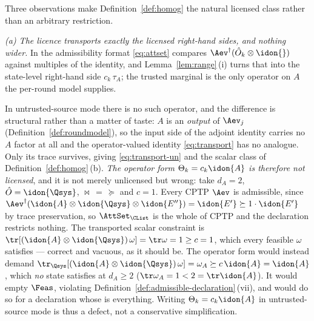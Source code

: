 
\begin{remark}\label{rem:homog}
Three observations make Definition~\ref{def:homog} the natural
licensed class rather than an arbitrary restriction.

\emph{(a) The licence transports exactly the licensed right-hand sides, and
nothing wider.} In  the admissibility format
\eqref{eq:attset} compares $\Aev^{\dagger}(\hat O_k\otimes\idon{})$ against
multiples of the identity, and Lemma~\ref{lem:range}\,(i) turns that into the
state-level right-hand side $c_k\,\tau_A$; the trusted marginal is the only
operator on $A$ the per-round model supplies.

In untrusted-source mode there is no such operator, and the difference
is structural rather than a matter of taste: $A$ is an \emph{output}
of $\Aev_j$ (Definition~\ref{def:roundmodel}), so the input side of the
adjoint identity carries no $A$ factor at all and the operator-valued
identity \eqref{eq:transport} has no analogue. Only its trace
survives, giving \eqref{eq:transport-un} and the scalar class of
Definition~\ref{def:homog}\,(b). \emph{The operator form
$\Theta_k=c_k\idon{A}$ is therefore not licensed}, and it is not
merely unlicensed but wrong: take $d_A=2$, $\hat O=\idon{\Qsys}$,
$\bowtie\,=\,\succeq$ and $c=1$. Every CPTP $\Aev$ is admissible, since
$\Aev^{\dagger}(\idon{A}\otimes\idon{\Qsys}\otimes\idon{E''})
=\idon{E'}\succeq1\cdot\idon{E'}$ by trace preservation, so
$\AttSet_{\CList}$ is the whole of $\mathrm{CPTP}$ and the declaration
restricts nothing. The transported scalar constraint is
$\tr[(\idon{A}\otimes\idon{\Qsys})\,\omega]=\tr\omega=1\ge c=1$, which
every feasible $\omega$ satisfies --- correct and vacuous, as it should
be. The operator form would instead demand
$\tr_{\Qsys}[(\idon{A}\otimes\idon{\Qsys})\,\omega]
=\omega_A\succeq c\,\idon{A}=\idon{A}$, which \emph{no} state
satisfies at $d_A\ge2$ ($\tr\omega_A=1<2=\tr\idon{A}$). It would empty
$\Feas$, violating Definition~\ref{def:admissible-declaration}\,(vii), and would do so
for a declaration whose  is everything. Writing
$\Theta_k=c_k\idon{A}$ in untrusted-source mode is thus a defect, not
a conservative simplification.


\end{remark}
